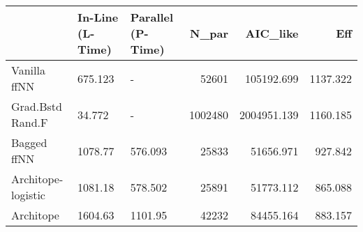 \begin{tabular}{lllrrr}
\toprule
{} & In-Line (L-Time) & Parallel (P-Time) &    N\_par &     AIC\_like &       Eff \\
\midrule
Vanilla ffNN       &          675.123 &                 - &    52601 &   105192.699 &  1137.322 \\
Grad.Bstd Rand.F   &           34.772 &                 - &  1002480 &  2004951.139 &  1160.185 \\
Bagged ffNN        &          1078.77 &           576.093 &    25833 &    51656.971 &   927.842 \\
Architope-logistic &          1081.18 &           578.502 &    25891 &    51773.112 &   865.088 \\
Architope          &          1604.63 &           1101.95 &    42232 &    84455.164 &   883.157 \\
\bottomrule
\end{tabular}
